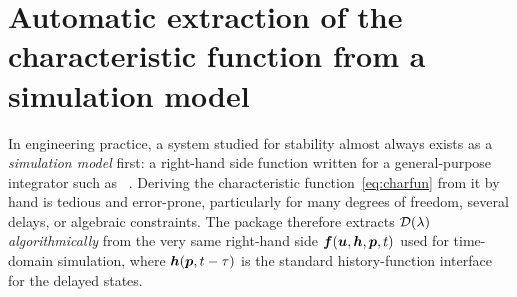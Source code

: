 \section{Automatic extraction of the characteristic function from a simulation model}\label{sec:extraction}

In engineering practice, a system studied for stability almost
always exists as a \emph{simulation model} first: a right-hand side
function written for a general-purpose integrator such as
~\cite{rackauckas2017differentialequations}.
Deriving the characteristic function~\eqref{eq:charfun} from it by hand is
tedious and error-prone, particularly for many degrees of freedom, several
delays, or algebraic constraints. The package therefore extracts
$\mathcal{D}(\lambda)$ \emph{algorithmically} from the very same right-hand side
$\boldsymbol{f}(\boldsymbol{u},\boldsymbol{h},\boldsymbol{p},t)$ used for time-domain simulation, where
$\boldsymbol{h}(\boldsymbol{p}, t-\tau)$ is the standard history-function interface for
the delayed states.

